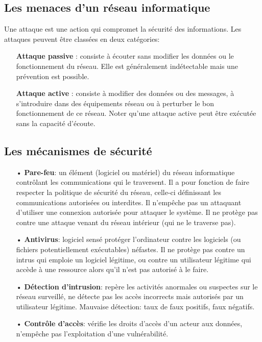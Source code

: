\newpage

\subsection{Les menaces d’un réseau informatique}
Une attaque est une action qui compromet la sécurité des informations. Les attaques peuvent être classées en deux catégories:\\
\begin{itemize}
\item[\textbf{Attaque passive}]: consiste à écouter sans modifier les données ou le fonctionnement du réseau. Elle est généralement indétectable mais une prévention est possible.\\
\item[\textbf{Attaque active}]: consiste à modifier des données ou des messages, à s'introduire dans des équipements réseau ou à perturber le bon fonctionnement de ce réseau. Noter qu'une attaque active peut être exécutée sans la capacité d'écoute.
\end{itemize}

\subsection{Les mécanismes de sécurité}
\begin{itemize}
\item[•]\textbf{Pare-feu}: un élément (logiciel ou matériel) du réseau informatique contrôlant les communications qui le traversent. Il a pour fonction de faire respecter la politique de sécurité du réseau, celle-ci définissant les communications autorisées ou interdites. Il n'empêche pas un attaquant d'utiliser une connexion autorisée pour attaquer le système. Il ne protège pas contre une attaque venant du réseau intérieur (qui ne le traverse pas).\\
\item[•]\textbf{Antivirus}: logiciel sensé protéger l'ordinateur contre les logiciels (ou fichiers potentiellement exécutables) néfastes. Il ne protège pas contre un intrus qui emploie un logiciel légitime, ou contre un utilisateur légitime qui accède à une ressource alors qu'il n'est pas autorisé à le faire.\\
\item[•]\textbf{Détection d'intrusion}: repère les activités anormales ou suspectes sur le réseau surveillé, ne détecte pas les accès incorrects mais autorisés par un utilisateur légitime. Mauvaise détection: taux de faux positifs, faux négatifs.\\
\item[•]\textbf{Contrôle d’accès}: vérifie les droits d’accès d'un acteur aux données, n'empêche pas l'exploitation d'une vulnérabilité.
\end{itemize}

